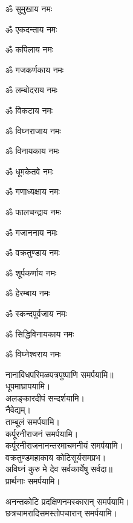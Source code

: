 \begin{enumerate}%
\begin{minipage}{0.475\linewidth}   
\item ॐ सुमुखाय नमः
\item ॐ एकदन्ताय नमः
\item ॐ कपिलाय नमः
\item ॐ गजकर्णकाय नमः
\item ॐ लम्बोदराय नमः
\item ॐ विकटाय नमः
\item ॐ विघ्नराजाय नमः
\item ॐ विनायकाय नमः
\item ॐ धूमकेतवे नमः
  \end{minipage}
  \begin{minipage}{0.525\linewidth}
\item ॐ गणाध्यक्षाय नमः
\item ॐ फालचन्द्राय नमः
\item ॐ गजाननाय नमः
\item ॐ वक्रतुण्डाय नमः
\item ॐ शूर्पकर्णाय नमः
\item ॐ हेरम्बाय नमः
\item ॐ स्कन्दपूर्वजाय नमः
\item ॐ सिद्धिविनायकाय नमः
\item ॐ विघ्नेश्वराय नमः
  \end{minipage}
\end{enumerate}
नानाविधपरिमळपत्रपुष्पाणि समर्पयामि॥\\
धूपमाघ्रापयामि।\\
अलङ्कारदीपं सन्दर्शयामि।\\
नैवेद्यम्।\\
ताम्बूलं समर्पयामि।\\
कर्पूरनीराजनं समर्पयामि।\\
कर्पूरनीराजनानन्तरमाचमनीयं समर्पयामि।\\
{वक्रतुण्डमहाकाय कोटिसूर्यसमप्रभ।}\\
{अविघ्नं कुरु मे देव सर्वकार्येषु सर्वदा॥}\\
प्रार्थनाः समर्पयामि।

अनन्तकोटि प्रदक्षिणनमस्कारान् समर्पयामि।\\
छत्रचामरादिसमस्तोपचारान् समर्पयामि।\\



